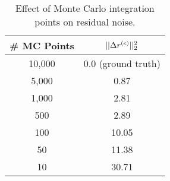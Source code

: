 \begin{table}[h]
    \centering
    \begin{tabular}{c|c}
        \# MC Points & $|| \Delta r^{(c)} ||_2^2$ \\
        \hline
        10,000 & 0.0 (ground truth) \\
        5,000 & 0.87 \\
        1,000 & 2.81 \\
        500 & 2.89 \\
        100 & 10.05 \\
        50 & 11.38 \\
        10 & 30.71 \\
    \end{tabular}
    \caption{Effect of Monte Carlo integration points on residual noise.}
    \label{tab:mc_study}
\end{table}

